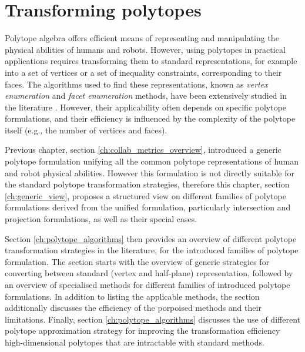 

\chapter{Transforming polytopes}

Polytope algebra offers efficient means of representing and manipulating the physical abilities of humans and robots. However, using polytopes in practical applications requires transforming them to standard representations, for example into a set of vertices or a set of inequality constraints, corresponding to their faces. The algorithms used to find these representations, known as \textit{vertex enumeration} and \textit{facet enumeration} methods, have been extensively studied in the literature \cite{fukuda2004frequently}. However, their applicability often depends on specific polytope formulations, and their efficiency is influenced by the complexity of the polytope itself (e.g., the number of vertices and faces).

Previous chapter, section \ref{ch:collab_metrics_overview}, introduced a generic polytope formulation unifying all the common polytope representations of human and robot physical abilities. However this formulation is not directly suitable for the standard polytope transformation strategies, therefore this chapter, section \ref{ch:generic_view}, proposes a structured view on different families of polytope formulations derived from the unified formulation, particularly intersection and projection formulations, as well as their special cases. 

Section \ref{ch:polytope_algorithms} then provides an overview of different polytope transformation strategies in the literature, for the introduced families of polytope formulation. The section starts with the overview of generic strategies for converting between standard (vertex and half-plane) representation, followed by an overview of specialised methods for different families of introduced polytope formulations. In addition to listing the applicable methods, the section additionally discusses the efficiency of the porpoised methods and their limitations. Finally, section \ref{ch:polytope_algorithms} discusses the use of different polytope approximation strategy for improving the transformation efficiency high-dimensional polytopes that are intractable with standard methods. 


